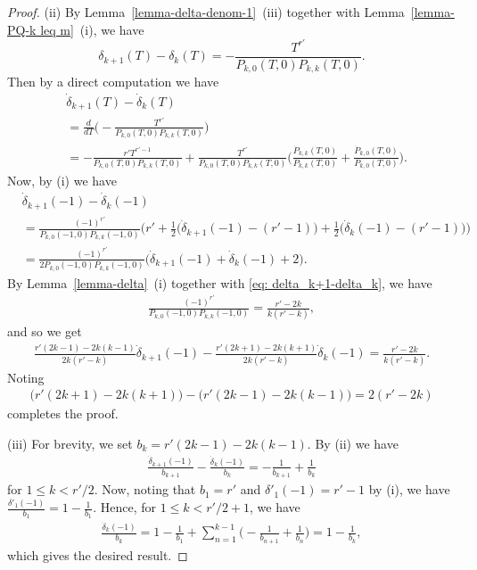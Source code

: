 \documentclass[11pt]{amsart}
\theoremstyle{definition}
\numberwithin{equation}{subsection}
\theoremstyle{plain}
\theoremstyle{plain}
\theoremstyle{plain}
\theoremstyle{plain}
\theoremstyle{plain}
\theoremstyle{plain}
\theoremstyle{plain}
\theoremstyle{plain}
\theoremstyle{plain}
\theoremstyle{plain}
\theoremstyle{plain}
\theoremstyle{plain}
\theoremstyle{definition}
\theoremstyle{definition}
\theoremstyle{definition}
\theoremstyle{remark}
\renewcommand{\(}{\textup{(}}
\renewcommand{\)}{\textup{)}}
\begin{document}
\begin{proof}
(ii) By Lemma~\ref{lemma-delta-denom-1}~(iii) together with Lemma~\ref{lemma-PQ-k leq m}~(i), we have
\begin{equation}\label{eq: delta_k+1-delta_k}
\delta_{k+1}(T)-\delta_k(T)=-\frac{T^{r'}}{P_{k,0}(T,0)P_{k,k}(T,0)}.
\end{equation}
Then by a direct computation we have
    \begin{align*}
    &\dot{\delta}_{k+1}(T)-\dot{\delta}_k(T)\\
    &=
        \frac{d}{dT}\bigg(
        -\frac{T^{r'}}{P_{k,0}(T,0)P_{k,k}(T,0)}
        \bigg)
        \\
        &=
        -\frac{r'T^{r'-1}}{P_{k,0}(T,0)P_{k,k}(T,0)}
        +
        \frac{T^{r'}}{P_{k,0}(T,0)P_{k,k}(T,0)}\bigg(
        \frac{\dot{P}_{k,k}(T,0)}{P_{k,k}(T,0)}
        +\frac{\dot{P}_{k,0}(T,0)}{P_{k,0}(T,0)}
        \bigg).
    \end{align*}
Now, by (i) we have
    \begin{align*}
    &\dot{\delta}_{k+1}(-1)-\dot{\delta}_k(-1)
        \\
        &=
        \frac{(-1)^{r'}}{P_{k,0}(-1,0)P_{k,k}(-1,0)}
        \bigg(
        r'
        +\frac{1}{2}\big(\dot{\delta}_{k+1}(-1)-(r'-1)\big)
        +\frac{1}{2}\big(\dot{\delta}_k(-1)-(r'-1)\big)
        \bigg)
        \\
        &=
        \frac{(-1)^{r'}}{2P_{k,0}(-1,0)P_{k,k}(-1,0)}
        \big(
        \dot{\delta}_{k+1}(-1)+\dot{\delta}_k(-1)+2
        \big).
    \end{align*}
By Lemma~\ref{lemma-delta}~(i) together with \eqref{eq: delta_k+1-delta_k}, we have
    \begin{align*}
        \frac{(-1)^{r'}}{P_{k,0}(-1,0)P_{k,k}(-1,0)}
        =\frac{r'-2k}{k(r'-k)},
    \end{align*}
and so we get
    \begin{align*}
        \frac{r'(2k-1)-2k(k-1)}{2k(r'-k)}\dot{\delta}_{k+1}(-1)
        -\frac{r'(2k+1)-2k(k+1)}{2k(r'-k)}\dot{\delta}_k(-1)
        =\frac{r'-2k}{k(r'-k)}.
    \end{align*}
Noting
    \begin{align*}
        \big(r'(2k+1)-2k(k+1)\big)-\big(r'(2k-1)-2k(k-1)\big)
        =2(r'-2k)
    \end{align*}
completes the proof.

(iii) For brevity, we set $b_k=r'(2k-1)-2k(k-1)$. By (ii) we have
    \begin{align*}
        \frac{\dot{\delta}_{k+1}(-1)}{b_{k+1}}-\frac{\dot{\delta}_k(-1)}{b_k}
        =
        -\frac{1}{b_{k+1}}+\frac{1}{b_k}
    \end{align*}
for $1\leq k<r'/2$. Now, noting that $b_1=r'$ and $\delta'_1(-1)=r'-1$ by (i), we have $\frac{\delta'_1(-1)}{b_1}=1-\frac{1}{b_1}$. Hence, for $1\leq k<r'/2+1$, we have
    \begin{align*}
        \frac{\dot{\delta}_k(-1)}{b_k}
        =1-\frac{1}{b_1}+\sum_{n=1}^{k-1}\bigg(-\frac{1}{b_{n+1}}+\frac{1}{b_n}\bigg)
        =1-\frac{1}{b_k},
    \end{align*}
which gives the desired result.


\end{proof}
\end{document}
